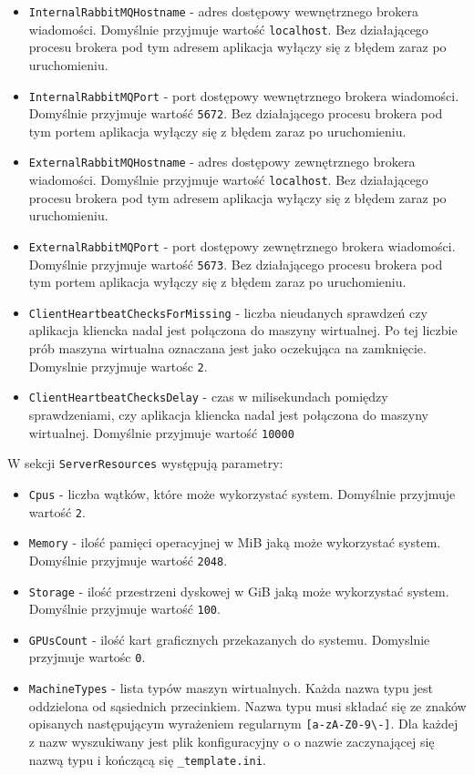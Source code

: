 \documentclass[../opis-rozwiazania.tex]{subfiles}
\begin{document}
\begin{itemize}
  \item \texttt{InternalRabbitMQHostname} - adres dostępowy wewnętrznego brokera wiadomości. Domyślnie przyjmuje wartość \texttt{localhost}. Bez działającego procesu brokera pod tym adresem aplikacja wyłączy się z błędem zaraz po uruchomieniu.
  \item \texttt{InternalRabbitMQPort} - port dostępowy wewnętrznego brokera wiadomości. Domyślnie przyjmuje wartość \texttt{5672}. Bez działającego procesu brokera pod tym portem aplikacja wyłączy się z błędem zaraz po uruchomieniu.
  \item \texttt{ExternalRabbitMQHostname} - adres dostępowy zewnętrznego brokera wiadomości. Domyślnie przyjmuje wartość \texttt{localhost}. Bez działającego procesu brokera pod tym adresem aplikacja wyłączy się z błędem zaraz po uruchomieniu.
  \item \texttt{ExternalRabbitMQPort} -  port dostępowy zewnętrznego brokera wiadomości. Domyślnie przyjmuje wartość \texttt{5673}. Bez działającego procesu brokera pod tym portem aplikacja wyłączy się z błędem zaraz po uruchomieniu.
  \item \texttt{ClientHeartbeatChecksForMissing} - liczba nieudanych sprawdzeń czy aplikacja kliencka nadal jest połączona do maszyny wirtualnej. Po tej liczbie prób maszyna wirtualna oznaczana jest jako oczekująca na zamknięcie. Domyslnie przyjmuje wartośc \texttt{2}.
  \item \texttt{ClientHeartbeatChecksDelay} - czas w milisekundach pomiędzy sprawdzeniami, czy aplikacja kliencka nadal jest połączona do maszyny wirtualnej. Domyślnie przyjmuje wartość \texttt{10000}
\end{itemize}

W sekcji \texttt{ServerResources} występują parametry:
\begin{itemize}
  \item \texttt{Cpus} - liczba wątków, które może wykorzystać system. Domyślnie przyjmuje wartość \texttt{2}.
  \item \texttt{Memory} - ilość pamięci operacyjnej w MiB jaką może wykorzystać system. Domyślnie przyjmuje wartość \texttt{2048}.
  \item \texttt{Storage} - ilość przestrzeni dyskowej w GiB jaką może wykorzystać system. Domyślnie przyjmuje wartość \texttt{100}.
  \item \texttt{GPUsCount} - ilość kart graficznych przekazanych do systemu. Domyslnie przyjmuje wartośc \texttt{0}.
  \item \texttt{MachineTypes} - lista typów maszyn wirtualnych. Każda nazwa typu jest oddzielona od sąsiednich przecinkiem. Nazwa typu musi składać się ze znaków opisanych następującym wyrażeniem regularnym \texttt{[a-zA-Z0-9\textbackslash-]}. Dla każdej z nazw wyszukiwany jest plik konfiguracyjny o o nazwie zaczynającej się nazwą typu i kończącą się \texttt{\_template.ini}.
\end{itemize}
\end{document}
